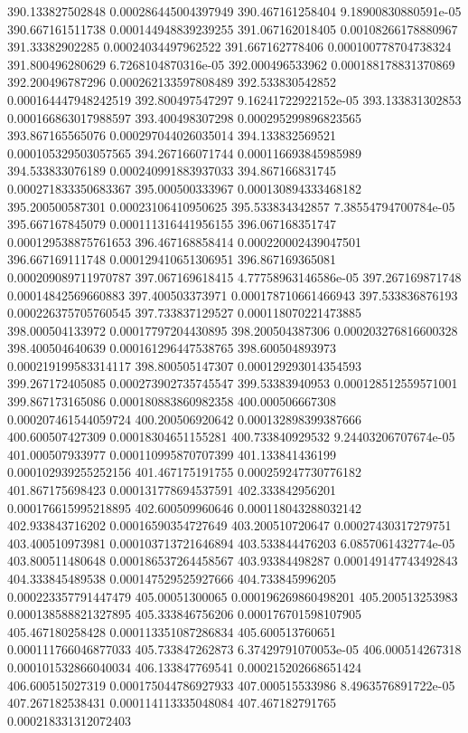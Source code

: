 {390.133827502848 0.000286445004397949
390.467161258404 9.18900830880591e-05
390.667161511738 0.000144948839239255
391.067162018405 0.00108266178880967
391.33382902285 0.00024034497962522
391.667162778406 0.000100778704738324
391.800496280629 6.7268104870316e-05
392.000496533962 0.000188178831370869
392.200496787296 0.000262133597808489
392.533830542852 0.000164447948242519
392.800497547297 9.16241722922152e-05
393.133831302853 0.000166863017988597
393.400498307298 0.000295299896823565
393.867165565076 0.000297044026035014
394.133832569521 0.000105329503057565
394.267166071744 0.000116693845985989
394.533833076189 0.000240991883937033
394.867166831745 0.000271833350683367
395.000500333967 0.000130894333468182
395.200500587301 0.00023106410950625
395.533834342857 7.38554794700784e-05
395.667167845079 0.000111316441956155
396.067168351747 0.000129538875761653
396.467168858414 0.000220002439047501
396.667169111748 0.000129410651306951
396.867169365081 0.000209089711970787
397.067169618415 4.77758963146586e-05
397.267169871748 0.00014842569660883
397.400503373971 0.000178710661466943
397.533836876193 0.000226375705760545
397.733837129527 0.000118070221473885
398.000504133972 0.00017797204430895
398.200504387306 0.000203276816600328
398.400504640639 0.000161296447538765
398.600504893973 0.000219199583314117
398.800505147307 0.000129293014354593
399.267172405085 0.000273902735745547
399.53383940953 0.000128512559571001
399.867173165086 0.000180883860982358
400.000506667308 0.000207461544059724
400.200506920642 0.000132898399387666
400.600507427309 0.00018304651155281
400.733840929532 9.24403206707674e-05
401.000507933977 0.000110995870707399
401.133841436199 0.000102939255252156
401.467175191755 0.000259247730776182
401.867175698423 0.000131778694537591
402.333842956201 0.000176615995218895
402.600509960646 0.000118043288032142
402.933843716202 0.00016590354727649
403.200510720647 0.00027430317279751
403.400510973981 0.000103713721646894
403.533844476203 6.0857061432774e-05
403.800511480648 0.000186537264458567
403.93384498287 0.000149147743492843
404.333845489538 0.000147529525927666
404.733845996205 0.000223357791447479
405.00051300065 0.000196269860498201
405.200513253983 0.000138588821327895
405.333846756206 0.000176701598107905
405.467180258428 0.000113351087286834
405.600513760651 0.000111766046877033
405.733847262873 6.37429791070053e-05
406.000514267318 0.000101532866040034
406.133847769541 0.000215202668651424
406.600515027319 0.000175044786927933
407.000515533986 8.4963576891722e-05
407.267182538431 0.000114113335048084
407.467182791765 0.000218331312072403
}
